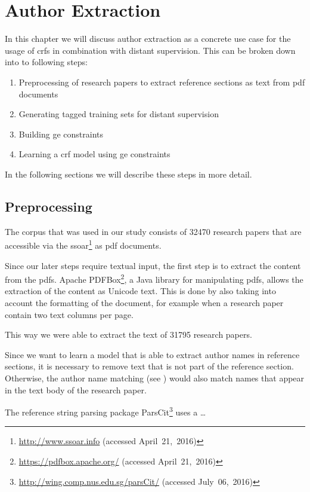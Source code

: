 \chapter{Author Extraction}\label{cha:author-extraction}

In this chapter we will discuss author extraction as a concrete use case for the usage of \glspl{crf} in combination with \gls{distant supervision}.
This can be broken down into to following steps:
\begin{enumerate}
  \item Preprocessing of research papers to extract reference sections as text from \gls{pdf} documents
  \item Generating tagged training sets for distant supervision
  \item Building \acrfull{ge} constraints
  \item Learning a \gls{crf} model using \gls{ge} constraints
\end{enumerate}
In the following sections we will describe these steps in more detail.

\section{Preprocessing}\label{sec:ae-preprocessing}

The corpus that was used in our study consists of 32470 research papers that are accessible via the \gls{ssoar}\footnote{\url{http://www.ssoar.info} (accessed April~21,~2016)} as \gls{pdf} documents.

Since our later steps require textual input, the first step is to extract the content from the \glspl{pdf}.
Apache PDFBox\footnote{\url{https://pdfbox.apache.org/} (accessed April~21,~2016)}, a Java library for manipulating \glspl{pdf}, allows the extraction of the content as Unicode text.
This is done by also taking into account the formatting of the document, for example when a research paper contain two text columns per page.

This way we were able to extract the text of 31795 research papers.

\bigskip

Since we want to learn a model that is able to extract author names in reference sections, it is necessary to remove text that is not part of the reference section.
Otherwise, the author name matching (see ) would also match names that appear in the text body of the research paper.

The reference string parsing package ParsCit\footnote{\url{http://wing.comp.nus.edu.sg/parsCit/} (accessed July~06,~2016)} uses a \dots


